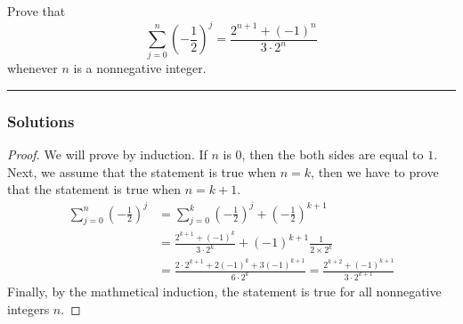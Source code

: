 \begin{question}
Prove that
$$
\sum_{j=0}^n\left(-\frac{1}{2}\right)^j=\frac{2^{n+1}+(-1)^n}{3 \cdot 2^n}
$$
whenever $n$ is a nonnegative integer.
\end{question}

\par\noindent\rule{\textwidth}{0.5pt}

\subsubsection*{Solutions}

\begin{proof}
    We will prove by induction. If $n$ is $0$, then the both sides are equal to $1$. Next, we assume that the statement is true when $n = k$, then we have to prove that the statement is true when $n = k+1$.
    \begin{align*}
        \sum _{j = 0}^n \left( - \frac 1 2 \right) ^j
            &= \sum _{j=0}^{k} \left( - \frac 1 2 \right) ^j + \left( - \frac 1 2 \right) ^{k+1}\\
            &= \frac{2^{k+1} + (-1)^k}{3 \cdot 2^k} + (-1)^{k+1} \frac 1 {2 \times 2^{k}}\\
            &= \frac{2\cdot2^{k+1} + 2(-1)^k + 3(-1)^{k+1}}{6 \cdot 2^k}
            = \frac{2^{k+2} + (-1)^{k+1}}{3 \cdot 2^{k+1}}
    \end{align*}
    Finally, by the mathmetical induction, the statement is true for all nonnegative integers $n$.
\end{proof}